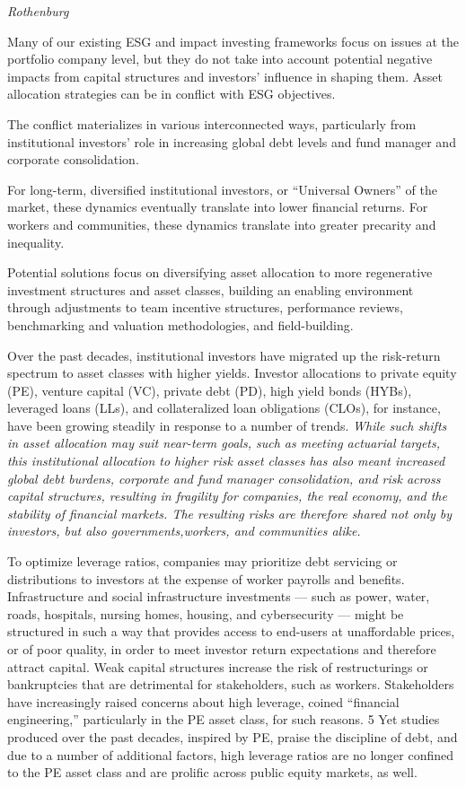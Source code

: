 \documentclass[
]{book}
\begin{document}
\emph{Rothenburg}

Many of our existing ESG and impact investing frameworks focus on issues at the
portfolio company level, but they do not take into account potential negative
impacts from capital structures and investors' influence in shaping them.
Asset allocation strategies can be in conflict with ESG objectives.

The conflict materializes in various interconnected ways, particularly from
institutional investors' role in increasing global debt levels and
fund manager and corporate consolidation.

For long-term, diversified institutional investors, or ``Universal Owners''
of the market, these dynamics eventually translate into lower financial returns.
For workers and communities, these dynamics translate into
greater precarity and inequality.

Potential solutions focus on diversifying asset allocation to
more regenerative investment structures and asset classes, building an
enabling environment through adjustments to team incentive structures, performance reviews,
benchmarking and valuation methodologies, and field-building.

Over the past decades, institutional investors have migrated up
the risk-return spectrum to asset classes with higher yields.
Investor allocations to private equity (PE), venture capital (VC), private debt (PD),
high yield bonds (HYBs), leveraged loans (LLs), and
collateralized loan obligations (CLOs), for instance,
have been growing steadily in response to a number of trends.
\emph{While such shifts in asset allocation may suit near-term goals,
such as meeting actuarial targets, this institutional allocation to higher risk asset
classes has also meant increased global debt burdens, corporate and
fund manager consolidation, and risk across capital structures,
resulting in fragility for companies, the real economy, and the stability of
financial markets.
The resulting risks are therefore shared not only by investors,
but also governments,workers, and communities alike.}

To optimize leverage ratios, companies may prioritize debt servicing or distributions to investors at the
expense of worker payrolls and benefits. Infrastructure and social infrastructure investments --- such as
power, water, roads, hospitals, nursing homes, housing, and cybersecurity --- might be structured in
such a way that provides access to end-users at unaffordable prices, or of poor quality, in order to meet
investor return expectations and therefore attract capital. Weak capital structures increase the risk of
restructurings or bankruptcies that are detrimental for stakeholders, such as workers. Stakeholders have
increasingly raised concerns about high leverage, coined ``financial engineering,'' particularly in the PE
asset class, for such reasons. 5 Yet studies produced over the past decades, inspired by PE, praise the
discipline of debt, and due to a number of additional factors, high leverage ratios are no longer confined
to the PE asset class and are prolific across public equity markets, as well.
\end{document}
